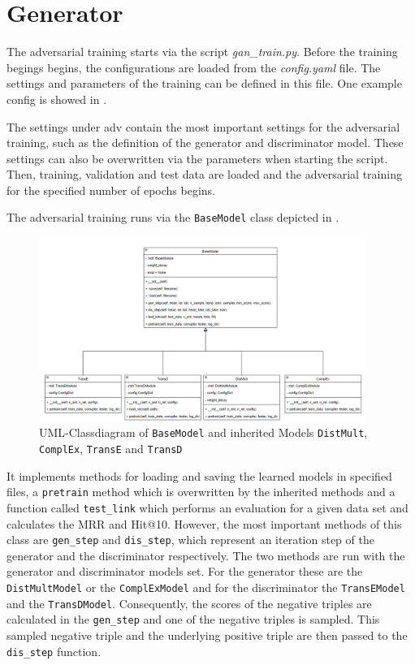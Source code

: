 \section{Generator}
\label{sec:generator}

The adversarial training starts via the script \textit{gan\_train.py}.
Before the training begings begins, the configurations are loaded from the \textit{config.yaml} file.
The settings and parameters of the training can be defined in this file.
One example config is showed in .

The settings under adv contain the most important settings for the adversarial training, such as the definition of the generator and discriminator model.
These settings can also be overwritten via the parameters when starting the script.
Then, training, validation and test data are loaded and the adversarial training for the specified number of epochs begins.

The adversarial training runs via the \texttt{BaseModel} class depicted in .
\begin{figure}[t]
  \centering
    \includegraphics[width=0.95\textwidth]{figures/BaseModel.png}
  \caption{\ac{UML}-Classdiagram of \texttt{BaseModel} and inherited Models  \texttt{DistMult},  \texttt{ComplEx},  \texttt{TransE} and  \texttt{TransD}}
  \label{fig:basemodel_classdiagram}
\end{figure}
It implements methods for loading and saving the learned models in specified files, a \texttt{pretrain} method which is overwritten by the inherited methods and a function called \texttt{test\_link} which performs an evaluation for a given data set and calculates the MRR and Hit@10.
However, the most important methods of this class are \texttt{gen\_step} and \texttt{dis\_step}, which represent an iteration step of the generator and the discriminator respectively.
The two methods are run with the generator and discriminator models set.
For the generator these are the \texttt{DistMultModel} or the \texttt{ComplExModel} and for the discriminator the \texttt{TransEModel} and the \texttt{TransDModel}.
Consequently, the scores of the negative triples are calculated in the \texttt{gen\_step} and one of the negative triples is sampled.
This sampled negative triple and the underlying positive triple are then passed to the \texttt{dis\_step} function.

